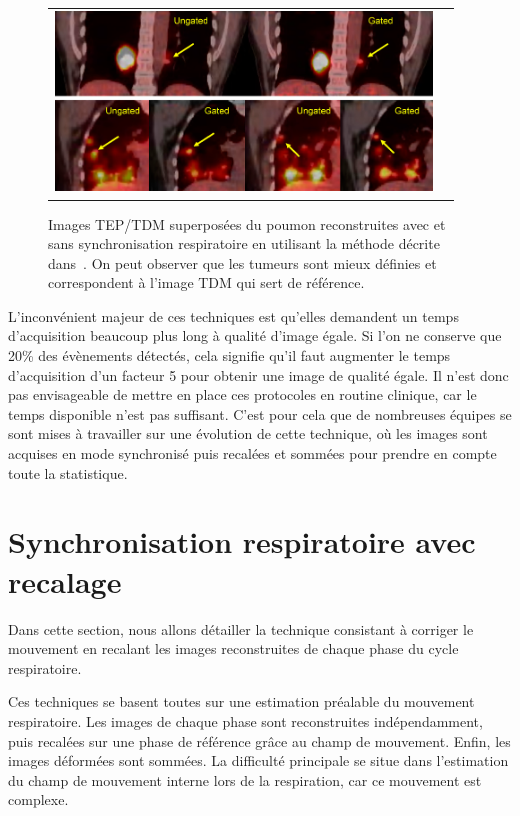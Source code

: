 \begin{figure}[h!]
	\begin{center}
		\begin{tabular}{c c}
			\includegraphics[width=10cm]{images/chang2010}
		\end{tabular}
	\end{center}
	\caption[Images TEP/TDM superposées du poumon]{Images TEP/TDM superposées du poumon reconstruites avec et sans synchronisation respiratoire en utilisant la méthode décrite dans~\cite{GuopingChang2010Implementation}. On peut observer que les tumeurs sont mieux définies et correspondent à l'image TDM qui sert de référence.} 
	\label{fig:chang2010}
\end{figure}

L'inconvénient majeur de ces techniques est qu'elles demandent un temps d'acquisition beaucoup plus long à qualité d'image égale. Si l'on ne conserve que 20\% des évènements détectés, cela signifie qu'il faut augmenter le temps d'acquisition d'un facteur 5 pour obtenir une image de qualité égale. Il n'est donc pas envisageable de mettre en place ces protocoles en routine clinique, car le temps disponible n'est pas suffisant. C'est pour cela que de nombreuses équipes se sont mises à travailler sur une évolution de cette technique, où les images sont acquises en mode synchronisé  puis recalées et sommées pour prendre en compte toute la statistique.

\section{Synchronisation respiratoire avec recalage}
\label{lab:corrPostRecon}

Dans cette section, nous allons détailler la technique consistant à corriger le mouvement en recalant les images reconstruites de chaque phase du cycle respiratoire.

Ces techniques se basent toutes sur une estimation préalable du mouvement respiratoire. Les images de chaque phase sont reconstruites indépendamment, puis recalées sur une phase de référence grâce au champ de mouvement. Enfin, les images déformées sont sommées. La difficulté principale se situe dans l'estimation du champ de mouvement interne lors de la respiration, car ce mouvement est complexe.

